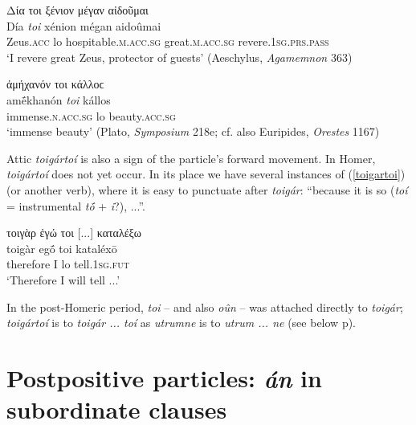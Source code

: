 \begin{exe}
\ex Δία τοι ξένιον μέγαν αἰδοῦμαι\\
\gll Día \emph{toi} xénion mégan aidoûmai\\
Zeus.\textsc{acc} lo hospitable.\textsc{m.acc.sg} great.\textsc{m.acc.sg} revere.\textsc{1sg.prs.pass}\\
\trans `I revere great Zeus, protector of guests' (Aeschylus, \textit{Agamemnon} 363)
\label{toi21}
\end{exe}

\begin{exe}
\ex ἀμήχανόν τοι κάλλοϲ\\
\gll amḗkhanón \emph{toi} kállos\\
immense.\textsc{n.acc.sg} lo beauty.\textsc{acc.sg}\\
\trans `immense beauty'
(Plato, \textit{Symposium} 218e; cf. also Euripides, \textit{Orestes} 1167)
\label{toi22}
\end{exe}

Attic \textit{toigártoí} is also a sign of the particle's forward movement. In Homer, \textit{toigártoí} does not yet occur. In its place we have several instances of (\ref{toigartoi}) (or another  verb), where it is easy to punctuate after \textit{toigár}: ``because it is so (\textit{toí} = instrumental \textit{tṓ} + \textit{i}?), ...''. 
\begin{exe}
\ex τοιγὰρ ἐγώ τοι {[}...{]} καταλέξω\\
\gll toigàr egṓ toi kataléxō\\
therefore I lo tell.\textsc{1sg.fut}\\
\trans `Therefore I will tell ...'
\label{toigartoi}
\end{exe}

In the post-Homeric period, \textit{toi} -- and also \textit{oûn} -- was attached directly to \textit{toigár}; \textit{toigártoí} is to \textit{toigár ... toí} as  \textit{utrumne} is to \textit{utrum ... ne} (see below p\pageref{utrumne}).


\section{Postpositive particles: \emph{án} in subordinate clauses}

